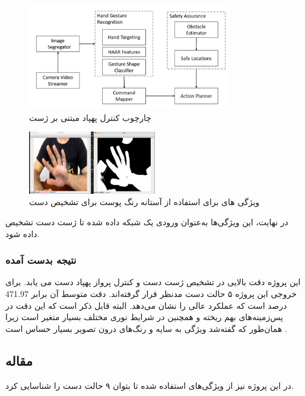\begin{figure}[h]
    \centering
    \includegraphics[width=0.8\textwidth]{Haar2.png}
    \caption{چارچوب کنترل پهپاد مبتنی بر ژست}
\end{figure}


\begin{figure}[h]
    \centering
    \includegraphics[width=0.5\textwidth]{Haar3.png}
    \caption{ ویژگی های  برای استفاده از آستانه رنگ پوست برای تشخیص دست}
\end{figure}


در نهایت، این ویژگی‌ها به‌عنوان ورودی یک شبکه   داده شده تا ژست دست تشخیص داده شود.

\subsubsection{نتیجه بدست آمده}
این پروژه دقت بالایی در تشخیص ژست دست و کنترل پرواز پهپاد دست می یابد. برای خروجی این پروژه ۵ حالت دست مدنظر قرار گرفته‌اند. 
دقت متوسط آن برابر 471.97 درصد است که عملکرد عالی را نشان می‌دهد. البته قابل ذکر است که این دقت در پس‌زمینه‌های بهم ریخته و همچنین در شرایط نوری مختلف بسیار متغیر است  زیرا همان‌طور که گفته‌شد ویژگی  به سایه و رنگ‌های درون تصویر بسیار حساس است \cite{natarajan2018hand}.



\subsection{مقاله }
در این پروژه نیز از ویژگی‌های  استفاده شده تا بتوان ۹ حالت دست را شناسایی کرد. 


